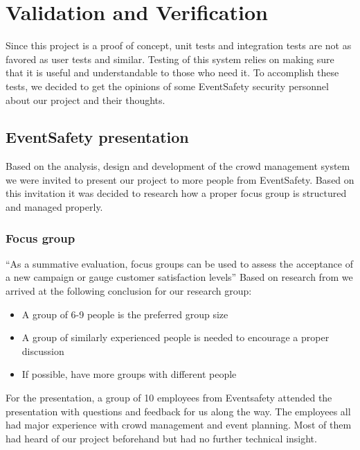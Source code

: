 \documentclass[
]{article}
\providecommand{\tightlist}{%
  \setlength{\itemsep}{0pt}\setlength{\parskip}{0pt}}\usepackage{longtable,booktabs,array}
\begin{document}
\newpage{}

\hypertarget{validation-and-verification}{%
\section{Validation and
Verification}\label{validation-and-verification}}

Since this project is a proof of concept, unit tests and integration
tests are not as favored as user tests and similar. Testing of this
system relies on making sure that it is useful and understandable to
those who need it. To accomplish these tests, we decided to get the
opinions of some EventSafety security personnel about our project and
their thoughts.

\hypertarget{eventsafety-presentation}{%
\subsection{EventSafety presentation}\label{eventsafety-presentation}}

Based on the analysis, design and development of the crowd management
system we were invited to present our project to more people from
EventSafety. Based on this invitation it was decided to research how a
proper focus group is structured and managed properly.

\hypertarget{focus-group}{%
\subsubsection{Focus group}\label{focus-group}}

``As a summative evaluation, focus groups can be used to assess the
acceptance of a new campaign or gauge customer satisfaction levels''
\textcite{designers_research_manual} Based on research from
\textcite{designers_research_manual} we arrived at the following
conclusion for our research group:

\begin{itemize}
\tightlist
\item
  A group of 6-9 people is the preferred group size
\item
  A group of similarly experienced people is needed to encourage a
  proper discussion
\item
  If possible, have more groups with different people
\end{itemize}

For the presentation, a group of 10 employees from Eventsafety attended
the presentation with questions and feedback for us along the way. The
employees all had major experience with crowd management and event
planning. Most of them had heard of our project beforehand but had no
further technical insight.
\end{document}
